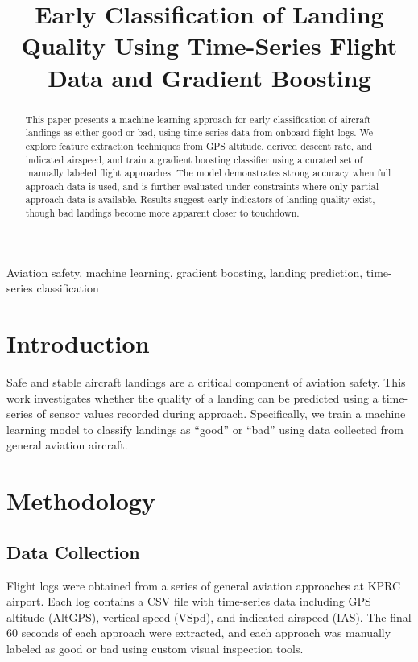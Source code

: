 \documentclass[conference]{IEEEtran}
\title{Early Classification of Landing Quality Using Time-Series Flight Data and Gradient Boosting}
\author{\IEEEauthorblockN{Nathan Johnson}
\IEEEauthorblockA{\textit{Embry-Riddle Aeronautical University} \\
Prescott, Arizona, USA \\
nathan.johnson@erau.edu}}
\begin{document}
\maketitle

\begin{abstract}
This paper presents a machine learning approach for early classification of aircraft landings as either good or bad, using time-series data from onboard flight logs. We explore feature extraction techniques from GPS altitude, derived descent rate, and indicated airspeed, and train a gradient boosting classifier using a curated set of manually labeled flight approaches. The model demonstrates strong accuracy when full approach data is used, and is further evaluated under constraints where only partial approach data is available. Results suggest early indicators of landing quality exist, though bad landings become more apparent closer to touchdown.
\end{abstract}

\begin{IEEEkeywords}
Aviation safety, machine learning, gradient boosting, landing prediction, time-series classification
\end{IEEEkeywords}

\section{Introduction}
Safe and stable aircraft landings are a critical component of aviation safety. This work investigates whether the quality of a landing can be predicted using a time-series of sensor values recorded during approach. Specifically, we train a machine learning model to classify landings as ``good'' or ``bad'' using data collected from general aviation aircraft.

\section{Methodology}

\subsection{Data Collection}
Flight logs were obtained from a series of general aviation approaches at KPRC airport. Each log contains a CSV file with time-series data including GPS altitude (AltGPS), vertical speed (VSpd), and indicated airspeed (IAS). The final 60 seconds of each approach were extracted, and each approach was manually labeled as good or bad using custom visual inspection tools.
\end{document}
